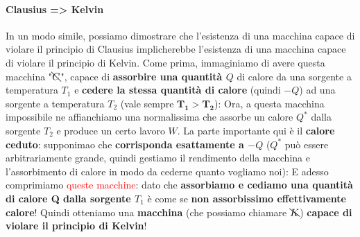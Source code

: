                 \paragraph{Clausius => Kelvin}
                    In un modo simile, possiamo dimostrare che l'esistenza di una macchina capace di violare il principio di Clausius implicherebbe l'esistenza di una macchina capace di violare il principio di Kelvin. Come prima, immaginiamo di avere questa macchina "$\bcancel{C}$", capace di \textbf{assorbire una quantità $Q$} di calore da una sorgente a temperatura $T_1$ e \textbf{cedere la stessa quantità di calore} (quindi $-Q$) ad una sorgente a temperatura $T_2$ (vale sempre $\mathbf{T_1>T_2}$):
                    Ora, a questa macchina impossibile ne affianchiamo una normalissima che assorbe un calore $Q^*$ dalla sorgente $T_2$ e produce un certo lavoro $W$. La parte importante qui è il \textbf{calore ceduto}: supponimao che \textbf{corrisponda esattamente a $-Q$} ($Q^*$ può essere arbitrariamente grande, quindi gestiamo il rendimento della macchina e l'assorbimento di calore in modo da cederne quanto vogliamo noi):
                    E adesso comprimiamo \textcolor{Red}{queste macchine}: dato che \textbf{assorbiamo e cediamo una quantità di calore Q dalla sorgente $T_1$} è come se \textbf{non assorbissimo effettivamente calore}! Quindi otteniamo una \textbf{macchina} (che possiamo chiamare $\bcancel{K}$) \textbf{capace di violare il principio di Kelvin}!

